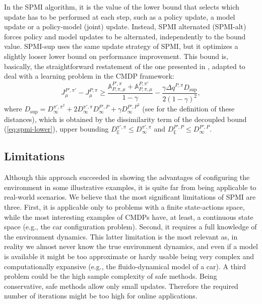 In the SPMI algorithm, it is the value of the lower bound that selects which update has to be performed at each step, such as a policy update, a model update or a policy-model (joint) update. Instead, SPMI alternated (SPMI-alt) forces policy and model updates to be alternated, independently to the bound value.
SPMI-sup uses the same update strategy of SPMI, but it optimizes a slightly looser lower bound on performance improvement. This bound is, basically, the straightforward restatement of the one presented in \citep{pmlr-v28-pirotta13}, adapted to deal with a learning problem in the CMDP framework:
\begin{equation}
	J_\mu^{P',\pi'} - J_\mu^{P,\pi} \geq \frac{\mathds{A}_{P,\pi, \mu}^{P',\pi}+\mathds{A}_{P,\pi, \mu}^{P,\pi'}}{1-\gamma} - \frac{\gamma\Delta q^{P,\pi}D_{\text{sup}}}{2 (1 -\gamma)^2}, 
\end{equation}
where $D_{\text{sup}}=D_\infty^{\pi',\pi^2} + 2 D_\infty^{\pi',\pi}D_\infty^{P',P} + \gamma D_\infty^{P',P^2}$ (see \citep{cmdp} for the definition of these distances), which is obtained by the dissimilarity term of the decoupled bound (\cref{eq:spmi-lower}), upper bounding $D_{\mathbb{E}}^{\pi',\pi} \leq D_\infty^{\pi',\pi}$ and $D_{\mathbb{E}}^{P',P} \leq D_\infty^{P',P}$.

\subsection{Limitations}

Although this approach succeeded in showing the advantages of configuring the environment in some illustrative examples, it is quite far from being applicable to real-world scenarios. We believe that the most significant limitations of SPMI are three. First, it is applicable only to problems with a finite state-actions space, while the most interesting examples of CMDPs have, at least, a continuous state space (e.g., the car configuration problem). Second, it requires a full knowledge of the environment dynamics. This latter limitation is the most relevant as, in reality we almost never know the true environment dynamics, and even if a model is available it might be too approximate or hardy usable being very complex and computationally expansive (e.g., the fluido-dynamical model of a car).
A third problem could be the high sample complexity of safe methods. Being conservative, safe methods allow only small updates. Therefore the required number of iterations might be too high for online applications.

